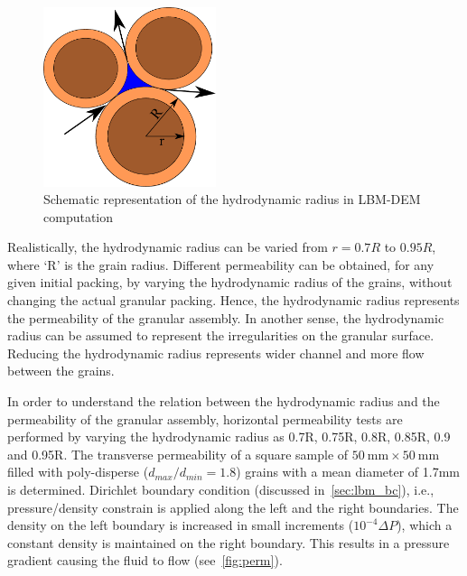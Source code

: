 \begin{figure}[htpb]
\centering
\includegraphics[width=0.45\textwidth]{reduction}
\caption{Schematic representation of the hydrodynamic radius in LBM-DEM 
computation}
\label{fig:reduction}
\end{figure}

Realistically, the hydrodynamic radius can be varied from $ r = 0.7 R$ to 
$0.95R$, where ‘R’ is the grain radius. Different permeability can be 
obtained, for any given initial packing, by varying the hydrodynamic radius of 
the grains, without changing the actual granular packing. Hence, the 
hydrodynamic radius represents the permeability of the granular assembly. In 
another sense, the hydrodynamic radius can be assumed to represent the 
irregularities on the granular surface. Reducing the hydrodynamic radius 
represents wider channel and more flow between the grains. 

In order to understand the relation between the hydrodynamic radius and the 
permeability of the granular assembly, horizontal permeability tests are 
performed by varying the hydrodynamic radius as 0.7R, 0.75R, 0.8R, 0.85R, 0.9 
and 0.95R. The transverse permeability of a square sample of $50~\si{\mm} 
\times 50~\si{\mm}$ filled with poly-disperse ($d_{max}/d_{min} = 1.8$) grains 
with a mean diameter of 1.7\si{\mm} is determined. Dirichlet boundary condition 
(discussed in~\cref{sec:lbm_bc}), i.e.,  pressure/density constrain is applied 
along the left and the right boundaries. The density on the left boundary is 
increased in small increments ($10^{-4} \Delta P$), which a constant density is 
maintained on the right boundary. This results in a pressure gradient causing 
the fluid to flow (see~\cref{fig:perm}). 


